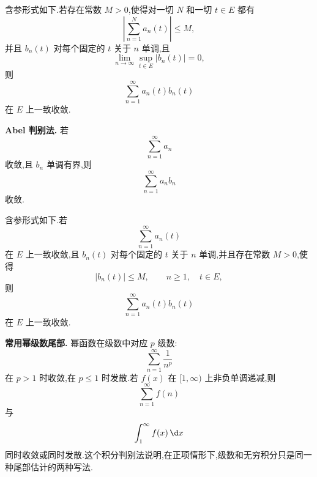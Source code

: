 含参形式如下.若存在常数 $M>0$,使得对一切 $N$ 和一切 $t\in E$ 都有
\begin{equation*}
	\left|\sum_{n=1}^N a_n(t)\right|\leq M,
\end{equation*}
并且 $b_n(t)$ 对每个固定的 $t$ 关于 $n$ 单调,且
\begin{equation*}
	\lim_{n\to\infty}\sup_{t\in E}|b_n(t)|=0,
\end{equation*}
则
\begin{equation*}
	\sum_{n=1}^{\infty}a_n(t)b_n(t)
\end{equation*}
在 $E$ 上一致收敛.

\textbf{Abel 判别法.}
若
\begin{equation*}
	\sum_{n=1}^{\infty}a_n
\end{equation*}
收敛,且 $b_n$ 单调有界,则
\begin{equation*}
	\sum_{n=1}^{\infty}a_nb_n
\end{equation*}
收敛.

含参形式如下.若
\begin{equation*}
	\sum_{n=1}^{\infty}a_n(t)
\end{equation*}
在 $E$ 上一致收敛,且 $b_n(t)$ 对每个固定的 $t$ 关于 $n$ 单调,并且存在常数 $M>0$,使得
\begin{equation*}
	|b_n(t)|\leq M,
	\qquad n\geq1,
	\quad t\in E,
\end{equation*}
则
\begin{equation*}
	\sum_{n=1}^{\infty}a_n(t)b_n(t)
\end{equation*}
在 $E$ 上一致收敛.

\textbf{常用幂级数尾部.}
幂函数在级数中对应 $p$ 级数:
\begin{equation*}
	\sum_{n=1}^{\infty}\frac1{n^p}
\end{equation*}
在 $p>1$ 时收敛,在 $p\leq1$ 时发散.若 $f(x)$ 在 $[1,\infty)$ 上非负单调递减,则
\begin{equation*}
	\sum_{n=1}^{\infty}f(n)
\end{equation*}
与
\begin{equation*}
	\int_1^\infty f(x)\,\d x
\end{equation*}
同时收敛或同时发散.这个积分判别法说明,在正项情形下,级数和无穷积分只是同一种尾部估计的两种写法.

